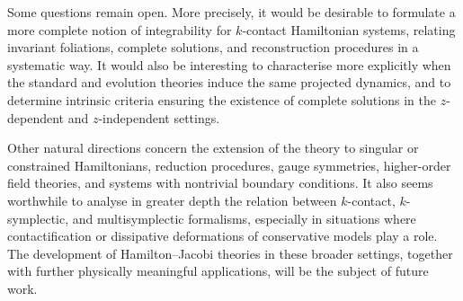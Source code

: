 \documentclass[11pt,twoside]{article}
\theoremstyle{plain}
\theoremstyle{definition}
\theoremstyle{remark}
\begin{document}
Some questions remain open. More precisely, it would be desirable to formulate a more complete notion of integrability for $k$-contact Hamiltonian systems, relating invariant foliations, complete solutions, and reconstruction procedures in a systematic way. It would also be interesting to characterise more explicitly when the standard and evolution theories induce the same projected dynamics, and to determine intrinsic criteria ensuring the existence of complete solutions in the $z$-dependent and $z$-independent settings.

Other natural directions concern the extension of the theory to singular or constrained Hamiltonians, reduction procedures, gauge symmetries, higher-order field theories, and systems with nontrivial boundary conditions. It also seems worthwhile to analyse in greater depth the relation between $k$-contact, $k$-symplectic, and multisymplectic formalisms, especially in situations where contactification or dissipative deformations of conservative models play a role. The development of Hamilton--Jacobi theories in these broader settings, together with further physically meaningful applications, will be the subject of future work.


%



\end{document}
